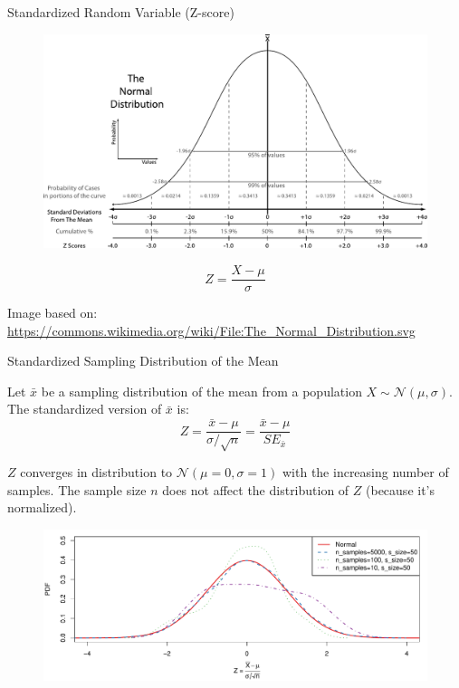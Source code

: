 \begin{frame}{Standardized Random Variable (Z-score)}
    \begin{figure}
        \includegraphics[width=0.85\linewidth]{gfx/web/The_Normal_Distribution}
    \end{figure}
    
    \begin{equation}
    Z = \frac{X - \mu}{\sigma}
    \end{equation}
    
    {\tiny Image based on: \url{https://commons.wikimedia.org/wiki/File:The_Normal_Distribution.svg}}
\end{frame}

\begin{frame}{Standardized Sampling Distribution of the Mean}

    Let $\bar{x}$ be a sampling distribution of the mean from a population $X \sim \mathcal{N}(\mu, \sigma)$. The standardized version of $\bar{x}$ is:
    \begin{equation}
    Z = \frac{\bar{x} - \mu}{\sigma / \sqrt{n}} = \frac{\bar{x} - \mu}{SE_{\bar{x}}}
    \end{equation}
    
    $Z$ converges in distribution to $\mathcal{N}(\mu = 0, \sigma = 1)$ with the increasing number of samples. The sample size $n$ does not affect the distribution of $Z$ (because it's normalized).
    
    \begin{figure}
        \includegraphics[width=0.85\linewidth]{R/plots/standardization}
    \end{figure}

\end{frame}

